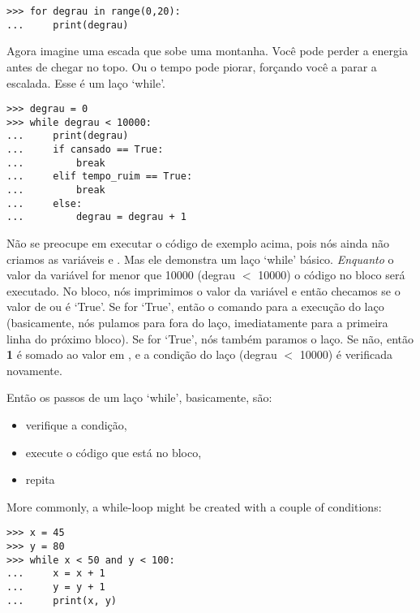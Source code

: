 \begin{listing}
\begin{verbatim}
>>> for degrau in range(0,20):
...     print(degrau)
\end{verbatim}
\end{listing}

Agora imagine uma escada que sobe uma montanha. Você pode perder a energia antes de chegar no topo. Ou o tempo pode piorar, forçando você a parar a escalada. Esse é um laço `while'.

\begin{listingignore}
\begin{verbatim}
>>> degrau = 0
>>> while degrau < 10000:
...     print(degrau)
...     if cansado == True:
...         break
...     elif tempo_ruim == True:
...         break
...     else:
...         degrau = degrau + 1
\end{verbatim}
\end{listingignore}

Não se preocupe em executar o código de exemplo acima, pois nós ainda não criamos as variáveis  e . Mas ele demonstra um laço `while' básico. \emph{Enquanto} o valor da variável  for menor que 10000 (degrau $<$ 10000) o código no bloco será executado. No bloco, nós imprimimos o valor da variável  e então checamos se o valor de  ou  é `True'. Se  for `True', então o comando  para a execução do laço (basicamente, nós pulamos para fora do laço, imediatamente para a primeira linha do próximo bloco). Se  for `True', nós também paramos o laço. Se não, então \textbf{1} é somado ao valor em , e a condição do laço (degrau $<$ 10000) é verificada novamente.
\par
\noindent
Então os passos de um laço `while', basicamente, são:

{\renewcommand{\labelitemi}{$\triangleright$}
\begin{itemize}
\item verifique a condição,
\item execute o código que está no bloco,
\item repita
\end{itemize}}

More commonly, a while-loop might be created with a couple of conditions:

\begin{listing}
\begin{verbatim}
>>> x = 45
>>> y = 80
>>> while x < 50 and y < 100:
...     x = x + 1
...     y = y + 1
...     print(x, y)
\end{verbatim}
\end{listing}

